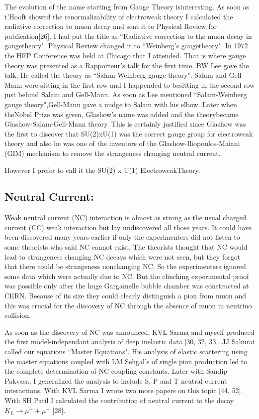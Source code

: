 The evolution of the name starting from Gauge Theory is\break interesting. As 
soon as t'Hooft showed the renormalizability of electroweak theory I 
calculated the radiative correction to muon decay and sent it to 
Physical Review for publication[26]. I had put the title as ``Radiative 
correction to the muon decay in gauge\break theory". Physical Review changed 
it to ``Weinberg's gauge\break theory". In 1972 the HEP Conference was held at 
Chicago that I attended. That is where gauge theory was presented as a\break 
Rapporteur's talk for the first time. BW Lee gave the talk. He called 
the theory as ``Salam-Weinberg gauge theory". Salam and Gell-Mann were 
sitting in the first row and I happended to be\break sitting in the second row 
just behind Salam and Gell-Mann. As soon as Lee mentioned 
``Salam-Weinberg gauge theory",\break Gell-Mann gave a nudge to Salam with his 
elbow. Later when the\break Nobel Prize was given, Glashow's name was added 
and the theory\break became Glashow-Salam-Gell-Mann theory. This is certainly 
justi\-fied since Glashow was the first to discover that SU(2)xU(1) was 
the correct gauge group for electroweak theory and also he was one of 
the inventors of the Glashow-Iliopoulos-Maiani (GIM) mechanism to remove 
the strangeness changing neutral current.

However I prefer to call it the SU(2) x U(1) Electroweak\break Theory.

\subsection*{Neutral Current:}

Weak neutral current (NC) interaction is almost as strong as the usual 
charged current (CC) weak interaction but lay undisco\-vered all those 
years. It could have been discovered many years earlier if only the 
experimenters did not listen to some theorists who said NC cannot exist. 
The theorists thought that NC would lead to strangeness changing NC 
decays which were not seen, but they for\-got that there could be 
strangeness nonchanging NC. So the experi\-menters ignored some data which 
were actually due to NC. But the clinching experimental proof was 
possible only after the huge Gargamelle bubble chamber was constructed 
at CERN. Becau\-se of its size they could clearly distinguish a pion from 
muon and this was crucial for the discovery of NC through the absence of 
muon in neutrino collision.

As soon as the discovery of NC was announced, KVL Sarma and myself 
produced the first model-independant analysis of deep inelastic data 
[30, 32, 33]. JJ Sakurai called our equations ``Master Equations". His 
analysis of elastic scattering using the master equations coupled with 
LM Sehgal's of single pion production led to the complete determination 
of NC coupling constants. Later with Sandip Pakvasa, I generalized the 
analysis to include S, P and T neutral current interactions. With KVL 
Sarma I wrote two more papers on this topic [44, 52]. With SH Patil I 
calculated the contribution of neutral current to the decay $K_L \rightarrow
\mu^+ + \mu^-$ [28].

